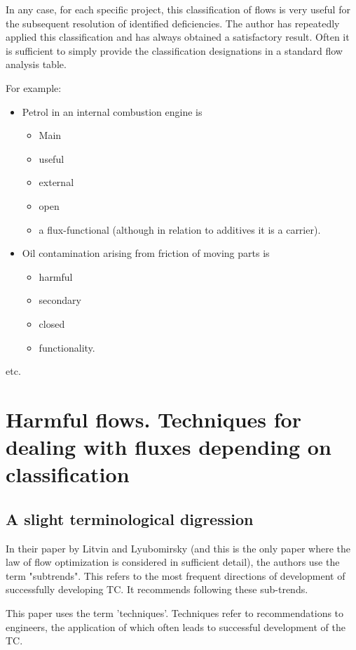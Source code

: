 \documentclass[a4paper,11pt]{article}
\begin{document}
In any case, for each specific project, this classification of flows is very
useful for the subsequent resolution of identified deficiencies. The author
has repeatedly applied this classification and has always obtained a
satisfactory result. Often it is sufficient to simply provide the
classification designations in a standard flow analysis table.

For example:
\begin{itemize}
\item Petrol in an internal combustion engine is
  \begin{itemize}
  \item Main
  \item useful
  \item external
  \item open
  \item a flux-functional (although in relation to additives it is a carrier).
  \end{itemize}
\item Oil contamination arising from friction of moving parts is
  \begin{itemize}
  \item harmful
  \item secondary
  \item closed
  \item functionality.
  \end{itemize}
\end{itemize}
etc.

\section{Harmful flows. Techniques for dealing with fluxes depending on
  classification}

\subsection{A slight terminological digression}

In their paper by Litvin and Lyubomirsky (and this is the only paper where the
law of flow optimization is considered in sufficient detail), the authors use
the term "subtrends". This refers to the most frequent directions of
development of successfully developing TC. It recommends following these
sub-trends.

This paper uses the term 'techniques'. Techniques refer to recommendations to
engineers, the application of which often leads to successful development of
the TC.
\end{document}
